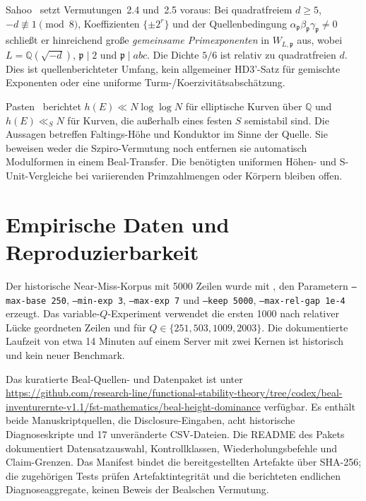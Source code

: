 \documentclass[11pt,a4paper]{article}
\begin{document}
Sahoo~\cite[Satz~1.10, Proposition~1.12]{Sahoo2026} setzt
Vermutungen~2.4 und~2.5 voraus: Bei quadratfreiem $d\ge5$,
$-d\not\equiv1\pmod8$, Koeffizienten $\{\pm2^r\}$ und der
Quellenbedingung
$\alpha_{\mathfrak p}\beta_{\mathfrak p}\gamma_{\mathfrak p}\ne0$
schließt er hinreichend große \emph{gemeinsame Primexponenten}
in $W_{L,\mathfrak p}$ aus, wobei
$L=\mathbb Q(\sqrt{-d})$, $\mathfrak p\mid2$ und
$\mathfrak p\mid abc$.
Die Dichte $5/6$ ist relativ zu quadratfreien $d$.
Dies ist quellenberichteter Umfang, kein allgemeiner HD3'-Satz
für gemischte Exponenten oder eine uniforme Turm-/Koerzivitätsabschätzung.

Pasten~\cite[Korollare~1.2--1.3]{Pasten2026} berichtet
$h(E)\ll N\log\log N$ für elliptische Kurven über $\mathbb Q$
und $h(E)\ll_S N$ für Kurven, die außerhalb eines festen $S$
semistabil sind. Die Aussagen betreffen Faltings-Höhe und
Konduktor im Sinne der Quelle.
Sie beweisen weder die Szpiro-Vermutung noch entfernen sie
automatisch Modulformen in einem Beal-Transfer.
Die benötigten uniformen Höhen- und S-Unit-Vergleiche bei
variierenden Primzahlmengen oder Körpern bleiben offen.

\appendix

\section{Empirische Daten und Reproduzierbarkeit}
\label{app:data}

Der historische Near-Miss-Korpus mit 5000 Zeilen wurde mit
, den Parametern
\texttt{--max-base 250}, \texttt{--min-exp 3}, \texttt{--max-exp 7} und
\texttt{--keep 5000}, \texttt{--max-rel-gap 1e-4} erzeugt. Das variable-$Q$-Experiment
verwendet die ersten 1000 nach relativer Lücke geordneten Zeilen und
 für
$Q\in\{251,503,1009,2003\}$. Die dokumentierte Laufzeit von etwa
14 Minuten auf einem Server mit zwei Kernen ist historisch und kein
neuer Benchmark.

Das kuratierte Beal-Quellen- und Datenpaket ist unter
\url{https://github.com/research-line/functional-stability-theory/tree/codex/beal-inventurernte-v1.1/fst-mathematics/beal-height-dominance}
verfügbar. Es enthält beide Manuskriptquellen, die Disclosure-Eingaben,
acht historische Diagnoseskripte und 17 unveränderte CSV-Dateien.
Die README des Pakets dokumentiert Datensatzauswahl, Kontrollklassen,
Wiederholungsbefehle und Claim-Grenzen. Das Manifest bindet die
bereitgestellten Artefakte über SHA-256; die zugehörigen Tests prüfen
Artefaktintegrität und die berichteten endlichen Diagnoseaggregate,
keinen Beweis der Bealschen Vermutung.
\end{document}
